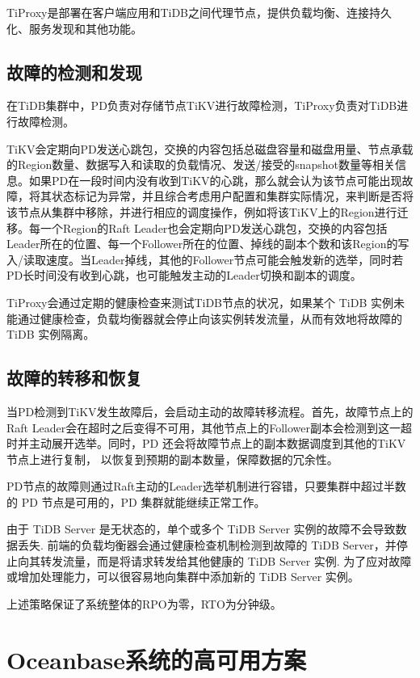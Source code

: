 TiProxy是部署在客户端应用和TiDB之间代理节点，提供负载均衡、连接持久化、服务发现和其他功能。


\subsection{故障的检测和发现}

在TiDB集群中，PD负责对存储节点TiKV进行故障检测，TiProxy负责对TiDB进行故障检测。

TiKV会定期向PD发送心跳包，交换的内容包括总磁盘容量和磁盘用量、节点承载的Region数量、数据写入和读取的负载情况、发送/接受的snapshot数量等相关信息。如果PD在一段时间内没有收到TiKV的心跳，那么就会认为该节点可能出现故障，将其状态标记为异常，并且综合考虑用户配置和集群实际情况，来判断是否将该节点从集群中移除，并进行相应的调度操作，例如将该TiKV上的Region进行迁移。每一个Region的Raft Leader也会定期向PD发送心跳包，交换的内容包括Leader所在的位置、每一个Follower所在的位置、掉线的副本个数和该Region的写入/读取速度。当Leader掉线，其他的Follower节点可能会触发新的选举，同时若PD长时间没有收到心跳，也可能触发主动的Leader切换和副本的调度。


TiProxy会通过定期的健康检查来测试TiDB节点的状况，如果某个 TiDB 实例未能通过健康检查，负载均衡器就会停止向该实例转发流量，从而有效地将故障的 TiDB 实例隔离。



\subsection{故障的转移和恢复}

当PD检测到TiKV发生故障后，会启动主动的故障转移流程。首先，故障节点上的Raft Leader会在超时之后变得不可用，其他节点上的Follower副本会检测到这一超时并主动展开选举。同时，PD 还会将故障节点上的副本数据调度到其他的TiKV节点上进行复制，
以恢复到预期的副本数量，保障数据的冗余性。

PD节点的故障则通过Raft主动的Leader选举机制进行容错，只要集群中超过半数的 PD 节点是可用的，PD 集群就能继续正常工作。

由于 TiDB Server 是无状态的，单个或多个 TiDB Server 实例的故障不会导致数据丢失. 前端的负载均衡器会通过健康检查机制检测到故障的 TiDB Server，并停止向其转发流量，而是将请求转发给其他健康的 TiDB Server 实例. 为了应对故障或增加处理能力，可以很容易地向集群中添加新的 TiDB Server 实例。

上述策略保证了系统整体的RPO为零，RTO为分钟级。


\section{Oceanbase系统的高可用方案}

